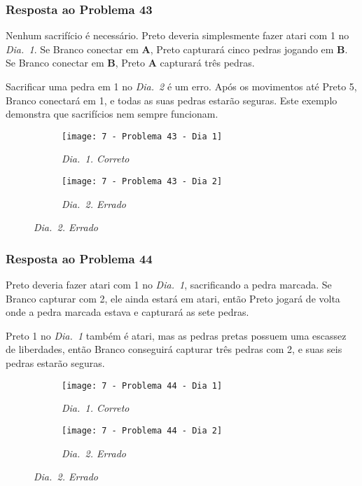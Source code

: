 \pagebreak

\subsubsection*{Resposta ao Problema 43}

Nenhum sacrifício é necessário. Preto deveria simplesmente fazer atari com 1 no \emph{Dia.\@~1}. Se Branco conectar em \textbf{A}, Preto capturará cinco pedras jogando em \textbf{B}. Se Branco conectar em \textbf{B}, Preto \textbf{A} capturará três pedras.
    
Sacrificar uma pedra em 1 no \emph{Dia.\@~2} é um erro. Após os movimentos até Preto 5, Branco conectará em 1, e todas as suas pedras estarão seguras. Este exemplo demonstra que sacrifícios nem sempre funcionam.

\begin{figure}[h!]
    \centering
    \begin{subfigure}[t]{.31\textwidth}
        \texttt{[image: 7 - Problema 43 - Dia 1]}
        \caption*{\emph{Dia.\@~1. Correto}}
    \end{subfigure}
    \hspace{1cm}
    \begin{subfigure}[t]{.31\textwidth}
        \texttt{[image: 7 - Problema 43 - Dia 2]}
        \caption*{\emph{Dia.\@~2. Errado}}
    \end{subfigure}
\end{figure}

\subsubsection*{Resposta ao Problema 44}

Preto deveria fazer atari com 1 no \emph{Dia.\@~1}, sacrificando a pedra marcada. Se Branco capturar com 2, ele ainda estará em atari, então Preto jogará de volta onde a pedra marcada estava e capturará as sete pedras.
    
Preto 1 no \emph{Dia.\@~1} também é atari, mas as pedras pretas possuem uma escassez de liberdades, então Branco conseguirá capturar três pedras com 2, e suas seis pedras estarão seguras.

\begin{figure}[h!]
    \centering
    \begin{subfigure}[t]{.31\textwidth}
        \texttt{[image: 7 - Problema 44 - Dia 1]}
        \caption*{\emph{Dia.\@~1. Correto}}
    \end{subfigure}
    \hspace{1cm}
    \begin{subfigure}[t]{.31\textwidth}
        \texttt{[image: 7 - Problema 44 - Dia 2]}
        \caption*{\emph{Dia.\@~2. Errado}}
    \end{subfigure}
\end{figure}

